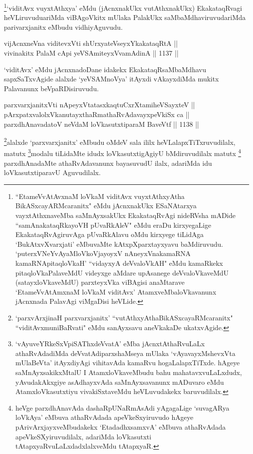 \begin{artha}
\footnote{``EtameVvA\s \s tAvxnaM loVkaM viditAvx vuyxtAthxyAtha BikASxcayARMcaranitx" eMdu jAcnxnakUkx ESaNAtarxya vayxtAthxnaveMba saMnAyxsakUkx EkakataqRvAgi nideRVsha mADide ``samAnakataqRkayoVH pUvaRkAleV" eMdu eraDu kirxyegaLige EkakataqRvAgiruvAga pUvaRkAlavu oMdu kirxyege tiLidAga `BukAtxvXvarxjati' eMbuvaMte kAtxpXparxtayxyavu baMdiruvudu. `puterxVNeYvAyaMloVkoVjayoyxV nAneyxVnakamaRNA kamaRNApitaqloVkaH' ``vidayxyA deVvaloVkAH" eMdu kamaRkekx pitaqloVkaPalaveMdU videyxge aMdare upAsanege deVvaloVkaveMdU (satayxloVkaveMdU) parxteyxVka viBAgisi anaMtarave `EtameVvA\s \s tAmxnaM loVkaM viditAvx' AtamxveMbaloVkavanunx jAcnxnada PalavAgi viMgaDisi heVLide.}`viditAvx vuyxtAthxya' eMdu (jAcnxnakUkx vutAthxnakUkx) EkakataqRvagi heVLiruvuduariMda viBAgoVkitx mUlaka PalakUkx saMbaMdhaviruvudariMda parivarxjanitx eMbudu vidhiyAguvudu.
\end{artha}


\begin{shl}
vijAcnxneVna viditevxVti shUrxyateV\s seyxYkakataqRtA || \\
vivinakitx PalaM cApi yeVSAmiteyxVvamAdinA ||  1137 ||  
\end{shl}

\begin{artha}
`viditAvx' eMdu jAcnxnadoDane idakekx EkakataqRsaMbaMdhavu sapxSaTxvAgide alalxde `yeVSAMnoV\s ya' itAyxdi vAkayxdiMda mukitx Palavanunx beVpaRDisiruvudu.
\end{artha}

\begin{shl}
parxvarxjanitxVti nApeyxVtatasxkaqtuCxrXtamiheVSayxteV || \\
pArxpatxvalolxVkanutayxthaRmathaRvAdavayxpeVkiSx ca || \\
parxdhAnavadatoV neVdaM loVkasutxtiparaM BaveVtf ||  1138 ||  
\end{shl}

\begin{artha}
\footnote{`parxvArxjinaH parxvarxjanitx' ``vutAthxyAthaBikASxcayaRMcaranitx" ``viditAvxmuniBaRvati" eMdu sanAyxsavu aneVkakaDe ukatxvAgide.}alalxde `parxvarxjanitx' eMbudu oMdeV sala ililx heVLalapxTiTxruvudilalx, matutx \footnote{`vAyuveYRkeSxVpiSAThxdeVvatA' eMba jAcnxtAthaRvuLaLx athaRvAdadiMda deVvatAdiparxshaMseya mUlaka `vAyavayxMshevxVta mUlaBeVta' itAyxdiyAgi vihitavAda kamaRvu hogaLalapxTiTxde. hAgeye saMnAyxsakikxMtalU I AtamxloVkaveMbudu bahu mahatavxvuLaLxdudx, yAvudakAkxgiye asAdhayxvAda saMnAyxsavanunx mADuvaro eMdu AtamxloVkasutxtiyu vivakiSxtaveMdu heVLuvudakekx baruvudilalx.}modalu tiLidaMte idudx loVkasutxtigAgiyU bMdiruvudilalx matutx \footnote{heVge parxdhAnavAda dashaRpUNaRmAsAdi yAgagaLige `suvagARya loVkAya' eMbuva athaRvAdada apeVkeSxyiruvudo hAgeye pArivArxjayxveMbudakekx `EtadadhxsamxvA' eMbuva athaRvAdada apeVkeSXyiruvudilalx, adariMda loVkasutxti tAtapxyaRvuLaLxdadxlalxveMdu tAtapxyaR.} parxdhAnadaMte athaRvAdavanunx bayasuvudU ilalx, adariMda idu loVkasutxtiparavU Aguvudilalx.
\end{artha}

